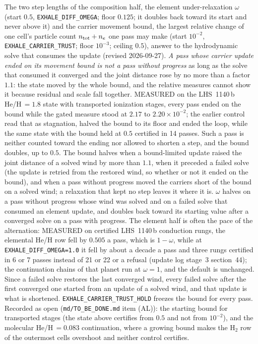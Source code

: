 The two step lengths of the composition half, the element under-relaxation
$\omega$ (start $0.5$, \texttt{EXHALE\_DIFF\_OMEGA}; floor $0.125$; it doubles
back toward its start and never above it) and the
carrier movement bound, the largest relative change of one cell's particle
count $n_{\rm tot}+n_e$ one pass may make (start $10^{-2}$,
\texttt{EXHALE\_CARRIER\_TRUST}; floor $10^{-3}$; ceiling $0.5$), answer to
the hydrodynamic solve that consumes the update (revised 2026-09-27).
\emph{A pass whose carrier update ended on its movement bound is not a pass
without progress} as long as the solve that consumed it converged and the
joint distance rose by no more than a factor $1.1$: the state moved by the
whole bound, and the relative measures cannot show it because residual and
scale fall together.  MEASURED on the LHS~1140\,b He/H\,$=1.8$ state with
transported ionization stages, every pass ended on the bound while the gated
measure stood at $2.17$ to $2.20\times10^{-2}$; the earlier control read that
as stagnation, halved the bound to its floor and ended the loop, while the
same state with the bound held at $0.5$ certified in 14 passes.  Such a pass
is neither counted toward the ending nor allowed to shorten a step, and the
bound doubles, up to $0.5$.  The bound halves when a bound-limited update
raised the joint distance of a solved wind by more than $1.1$, when it
preceded a failed solve (the update is retried from the restored wind, so
whether or not it ended on the bound), and when a pass
without progress moved the carriers short of the bound on a solved wind; a
relaxation that kept no step leaves it where it is.  $\omega$ halves on a pass
without progress whose wind was solved and on a failed solve that consumed an
element update, and doubles back toward its starting value after a converged
solve on a pass with progress.  The element half is often the pace of the
alternation: MEASURED on certified LHS~1140\,b conduction rungs, the elemental
He/H row fell by $0.505$ a pass, which is $1-\omega$, while at
\texttt{EXHALE\_DIFF\_OMEGA=1.0} it fell by about a decade a pass and three
rungs certified in 6 or 7 passes instead of 21 or 22 or a refusal (update log
stage~3 section~44); the continuation chains of that planet run at
$\omega = 1$, and the default is unchanged.  Since a failed solve restores
the last converged wind, every failed solve after the first converged one
started from an update of a solved wind, and that update is what is
shortened.  \texttt{EXHALE\_CARRIER\_TRUST\_HOLD} freezes
the bound for every pass.  Recorded as open (\texttt{md/TO\_BE\_DONE.md} item (AL)): the starting bound for
transported stages (the state above certifies from $0.5$ and not from
$10^{-2}$), and the molecular He/H\,$=0.083$ continuation, where a growing
bound makes the H$_2$ row of the outermost cells overshoot and neither control
certifies.

